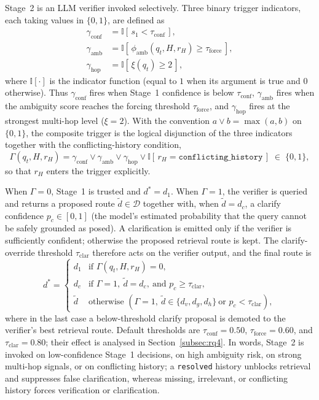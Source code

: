 \documentclass[pdflatex,sn-mathphys-num]{sn-jnl}
\begin{document}
Stage~2 is an LLM verifier invoked selectively. Three binary trigger
indicators, each taking values in $\{0,1\}$, are defined as
\begin{align}
\gamma_{\mathrm{conf}} &= \mathbb{I}[\,s_1 < \tau_{\mathrm{conf}}\,],
    \label{eq:gamma_conf}\\
\gamma_{\mathrm{amb}}  &= \mathbb{I}[\,\phi_{\mathrm{amb}}(q_t,H,r_H) \geq \tau_{\mathrm{force}}\,],
    \label{eq:gamma_amb}\\
\gamma_{\mathrm{hop}}  &= \mathbb{I}[\,\xi(q_t) \geq 2\,],
    \label{eq:gamma_hop}
\end{align}
where $\mathbb{I}[\cdot]$ is the indicator function (equal to $1$ when its
argument is true and $0$ otherwise). Thus $\gamma_{\mathrm{conf}}$ fires when
Stage~1 confidence is below $\tau_{\mathrm{conf}}$, $\gamma_{\mathrm{amb}}$
fires when the ambiguity score reaches the forcing threshold
$\tau_{\mathrm{force}}$, and $\gamma_{\mathrm{hop}}$ fires at the strongest
multi-hop level ($\xi=2$). With the convention $a\vee b=\max(a,b)$ on
$\{0,1\}$, the composite trigger is the logical disjunction of the three
indicators together with the conflicting-history condition,
\begin{equation}
\Gamma(q_t,H,r_H) = \gamma_{\mathrm{conf}}\vee\gamma_{\mathrm{amb}}\vee\gamma_{\mathrm{hop}}\vee\mathbb{I}[\,r_H=\texttt{conflicting\_history}\,]\;\in\;\{0,1\},
\label{eq:trigger_function}
\end{equation}
so that $r_H$ enters the trigger explicitly.

When $\Gamma=0$, Stage~1 is trusted and $d^*=d_1$. When $\Gamma=1$, the
verifier is queried and returns a proposed route $\tilde{d}\in\mathcal{D}$
together with, when $\tilde{d}=d_c$, a clarify confidence
$p_c\in[0,1]$ (the model's estimated probability that the query cannot be
safely grounded as posed). A clarification is emitted only if the verifier is
sufficiently confident; otherwise the proposed retrieval route is kept. The
clarify-override threshold $\tau_{\mathrm{clar}}$ therefore acts on the
verifier output, and the final route is
\begin{equation}
d^* =
\begin{cases}
d_1 & \text{if } \Gamma(q_t,H,r_H)=0,\\[3pt]
d_c & \text{if } \Gamma=1,\ \tilde{d}=d_c,\ \text{and } p_c\ge\tau_{\mathrm{clar}},\\[3pt]
\tilde{d} & \text{otherwise } (\Gamma=1,\ \tilde{d}\in\{d_v,d_g,d_h\}\ \text{or } p_c<\tau_{\mathrm{clar}}),
\end{cases}
\label{eq:final_route}
\end{equation}
where in the last case a below-threshold clarify proposal is demoted to the
verifier's best retrieval route. Default thresholds are
$\tau_{\mathrm{conf}}=0.50$, $\tau_{\mathrm{force}}=0.60$, and
$\tau_{\mathrm{clar}}=0.80$; their effect is analysed in
Section~\ref{subsec:rq4}. In words, Stage~2 is invoked on low-confidence
Stage~1 decisions, on high ambiguity risk, on strong multi-hop signals, or on
conflicting history; a \texttt{resolved} history unblocks retrieval and
suppresses false clarification, whereas missing, irrelevant, or conflicting
history forces verification or clarification.
\end{document}
